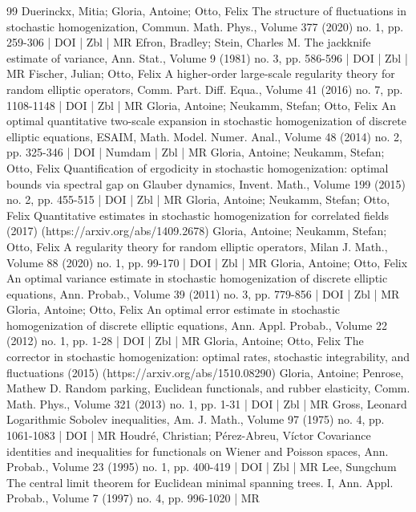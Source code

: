 \begin{thebibliography}{99}
Duerinckx, Mitia; Gloria, Antoine; Otto, Felix The structure of fluctuations in stochastic homogenization, Commun. Math. Phys., Volume 377 (2020) no. 1, pp. 259-306 | DOI | Zbl | MR
Efron, Bradley; Stein, Charles M. The jackknife estimate of variance, Ann. Stat., Volume 9 (1981) no. 3, pp. 586-596 | DOI | Zbl | MR
Fischer, Julian; Otto, Felix A higher-order large-scale regularity theory for random elliptic operators, Comm. Part. Diff. Equa., Volume 41 (2016) no. 7, pp. 1108-1148 | DOI | Zbl | MR
Gloria, Antoine; Neukamm, Stefan; Otto, Felix An optimal quantitative two-scale expansion in stochastic homogenization of discrete elliptic equations, ESAIM, Math. Model. Numer. Anal., Volume 48 (2014) no. 2, pp. 325-346 | DOI | Numdam | Zbl | MR
Gloria, Antoine; Neukamm, Stefan; Otto, Felix Quantification of ergodicity in stochastic homogenization: optimal bounds via spectral gap on Glauber dynamics, Invent. Math., Volume 199 (2015) no. 2, pp. 455-515 | DOI | Zbl | MR
Gloria, Antoine; Neukamm, Stefan; Otto, Felix Quantitative estimates in stochastic homogenization for correlated fields (2017) (https://arxiv.org/abs/1409.2678)
Gloria, Antoine; Neukamm, Stefan; Otto, Felix A regularity theory for random elliptic operators, Milan J. Math., Volume 88 (2020) no. 1, pp. 99-170 | DOI | Zbl | MR
Gloria, Antoine; Otto, Felix An optimal variance estimate in stochastic homogenization of discrete elliptic equations, Ann. Probab., Volume 39 (2011) no. 3, pp. 779-856 | DOI | Zbl | MR
Gloria, Antoine; Otto, Felix An optimal error estimate in stochastic homogenization of discrete elliptic equations, Ann. Appl. Probab., Volume 22 (2012) no. 1, pp. 1-28 | DOI | Zbl | MR
Gloria, Antoine; Otto, Felix The corrector in stochastic homogenization: optimal rates, stochastic integrability, and fluctuations (2015) (https://arxiv.org/abs/1510.08290)
Gloria, Antoine; Penrose, Mathew D. Random parking, Euclidean functionals, and rubber elasticity, Comm. Math. Phys., Volume 321 (2013) no. 1, pp. 1-31 | DOI | Zbl | MR
Gross, Leonard Logarithmic Sobolev inequalities, Am. J. Math., Volume 97 (1975) no. 4, pp. 1061-1083 | DOI | MR
Houdré, Christian; Pérez-Abreu, Víctor Covariance identities and inequalities for functionals on Wiener and Poisson spaces, Ann. Probab., Volume 23 (1995) no. 1, pp. 400-419 | DOI | Zbl | MR
Lee, Sungchum The central limit theorem for Euclidean minimal spanning trees. I, Ann. Appl. Probab., Volume 7 (1997) no. 4, pp. 996-1020 | MR

\end{thebibliography}
